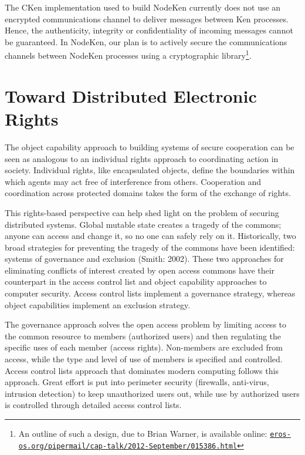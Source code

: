 \documentclass{llncs}
\newcommand{\myurl}[1]{{\href{http://#1}{\texttt{#1}}}}
\begin{document}
The CKen implementation used to build NodeKen currently does not use an encrypted communications channel to deliver messages between Ken processes. Hence, the authenticity, integrity or confidentiality of incoming messages cannot be guaranteed. In NodeKen, our plan is to actively secure the communications channels between NodeKen processes using a cryptographic library\footnote{
%
An outline of such a design, due to Brian Warner, is available online: \myurl{eros-os.org/pipermail/cap-talk/2012-September/015386.html}}.

\section{Toward Distributed Electronic Rights}

The object capability approach to building systems of secure cooperation can be seen as analogous to an individual rights approach to coordinating action in society. Individual rights, like encapsulated objects, define the boundaries within which agents may act free of interference from others. Cooperation and coordination across protected domains takes the form of the exchange of rights. 

This rights-based perspective can help shed light on the problem of securing distributed systems. Global mutable state creates a tragedy of the commons; anyone can access and change it, so no one can safely rely on it. Historically, two broad strategies for preventing the tragedy of the commons have been identified: systems of governance and exclusion (Smith: 2002). These two approaches for eliminating conflicts of interest created by open access commons have their counterpart in the access control list and object capability approaches to computer security.  Access control lists implement a governance strategy, whereas object capabilities implement an exclusion strategy. 

The governance approach solves the open access problem by limiting access to the common resource to members (authorized users) and then regulating the specific uses of each member (access rights). Non-members are excluded from access, while the type and level of use of members is specified and controlled. Access control lists approach that dominates modern computing follows this approach. Great effort is put into perimeter security (firewalls, anti-virus, intrusion detection) to keep unauthorized users out, while use by authorized users is controlled through detailed access control lists. 
\end{document}
